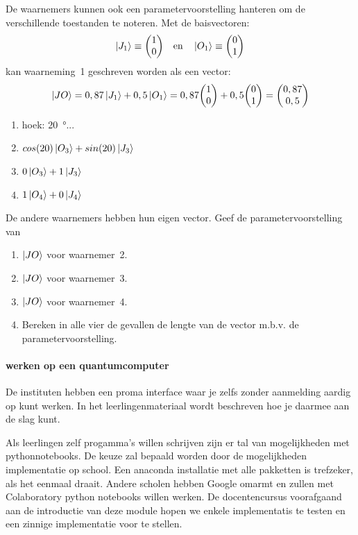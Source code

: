 \documentclass[../../main.tex]{subfiles}
\begin{document}
De waarnemers kunnen ook een parametervoorstelling hanteren om de verschillende toestanden te noteren. Met de baisvectoren:
\[\ket{J_1} \equiv \mqty(1\\0) \mathrm{\quad en \quad} \ket{O_1} \equiv \mqty(0\\1)\]
kan waarneming~1 geschreven worden als een vector:
\[\ket{JO} =0,87 \ket{J_1} + 0,5 \ket{O_1} =0,87
\mqty(1\\0)+0,5\mqty(0\\1)= \mqty(0,87\\0,5)\]

\begin{antwoord}
\begin{enumerate}
\item hoek: \SI{20}{\degree}...
\item $cos(20)\ket{O_3}+sin(20)\ket{J_3}$
\item $0\ket{O_3}+1\ket{J_3}$
\item $1\ket{O_4}+0\ket{J_4}$
\end{enumerate}
\end{antwoord}
\begin{opdracht}\label{opd:JO2}%
De andere waarnemers hebben hun eigen vector. Geef de parametervoorstelling van
\begin{enumerate}
\item $\ket{JO}$ voor waarnemer~2.
\item $\ket{JO}$ voor waarnemer~3.
\item $\ket{JO}$ voor waarnemer~4.
\item Bereken in alle vier de gevallen de lengte van de vector m.b.v. de parametervoorstelling.
\end{enumerate}
\end{opdracht}


\paragraph{werken op een quantumcomputer}
De instituten hebben een proma interface waar je zelfs zonder aanmelding aardig op kunt werken. In het leerlingenmateriaal wordt beschreven hoe je daarmee aan de slag kunt.

Als  leerlingen zelf progamma's willen schrijven zijn er tal van mogelijkheden met pythonnotebooks. De keuze zal bepaald worden door de mogelijkheden implementatie op school.
Een anaconda installatie met alle pakketten is trefzeker, als het eenmaal draait. Andere scholen hebben Google omarmt en zullen met Colaboratory python notebooks willen werken. De docentencursus voorafgaand aan de introductie van deze module hopen we enkele implementatis te testen en een zinnige implementatie voor te stellen.
\end{document}
